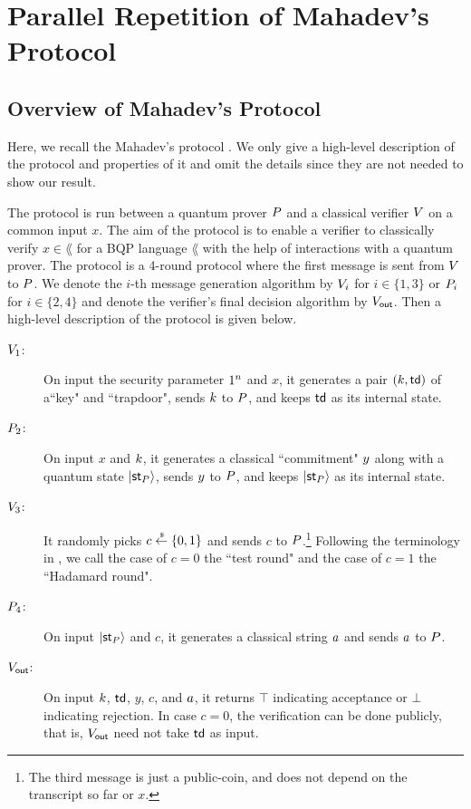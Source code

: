 

\section{Parallel Repetition of Mahadev's Protocol}

\subsection{Overview of Mahadev's Protocol}\label{sec:mahadev_overview}
Here, we recall the Mahadev's protocol \cite{FOCS:Mahadev18a}. We only give a high-level description of the protocol and properties of it and omit the details since they are not needed to show our result. 

The protocol is run between a quantum prover $P$ and a classical verifier $V$ on a common input $x$. The aim of the protocol is to enable a verifier to classically verify $x\in \lang$ for a BQP language $\lang$ with the help of interactions with a quantum prover.
The protocol is a 4-round protocol where the first message is sent from $V$ to $P$. 
We denote the $i$-th message generation algorithm by $V_i$ for $i\in\{1,3\}$ or $P_i$ for $i\in \{2,4\}$ and denote the verifier's final decision algorithm by $V_{\mathsf{out}}$.
Then a high-level description of the protocol is given below.
\begin{description}
\item[$V_1$:] On input the security parameter $1^n$ and $x$, it generates a pair $(k,\mathsf{td})$ of a``key" and ``trapdoor", sends $k$ to $P$, and keeps $\mathsf{td}$ as its internal state.
\item[$P_2$:] On input $x$ and $k$, it generates a classical ``commitment" $y$ along with a quantum state $\ket{\mathsf{st}_P}$, sends $y$ to $P$, and keeps $\ket{\mathsf{st}_P}$ as its internal state.
\item[$V_3$:] It randomly picks $c\overset{\hspace{0.1em}\mathsf{\scriptscriptstyle\$}}{\leftarrow} \{0,1\}$ and sends $c$ to $P$.\footnote{The third message is just a public-coin, and does not depend on the transcript so far or $x$.}
Following the terminology in \cite{FOCS:Mahadev18a}, we call the case of $c=0$ the ``test round" and the case of $c=1$ the ``Hadamard round".
\item[$P_4$:] On input $\ket{\mathsf{st}_P}$ and $c$, it generates a classical string $a$ and sends $a$ to $P$.
\item[$V_{\mathsf{out}}$:] On input $k$, $\mathsf{td}$, $y$, $c$, and $a$, it returns $\top$ indicating acceptance or $\bot$ indicating rejection.
In case $c=0$, the verification can be done publicly, that is, $V_{\mathsf{out}}$ need not take $\mathsf{td}$ as input.
\end{description}

